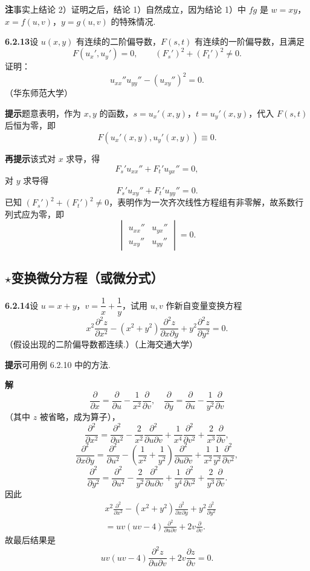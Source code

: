 \documentclass[UTF8, 12pt, fontset=fandol, oneside]{ctexart}
\begin{document}
\noindent\textbf{注}\quad 事实上结论 2）证明之后，结论 1）自然成立，因为结论 1）中 $fg$ 是 $w=xy$，$x=f(u,v)$，$y=g(u,v)$ 的特殊情况.

\noindent\textbf{6.2.13}\quad 设 $u(x,y)$ 有连续的二阶偏导数，$F(s,t)$ 有连续的一阶偏导数，且满足
\[
  F(u_x',u_y')=0,\qquad (F_s')^2+(F_t')^2\ne0.
\]
证明：
\[
  u_{xx}''u_{yy}''-(u_{xy}'')^2=0.
\]
（华东师范大学）

\noindent\textbf{提示}\quad 题意表明，作为 $x,y$ 的函数，$s=u_x'(x,y)$，$t=u_y'(x,y)$，代入 $F(s,t)$ 后恒为零，即
\[
  F(u_x'(x,y),u_y'(x,y))\equiv0.
\]

\noindent\textbf{再提示}\quad 该式对 $x$ 求导，得
\[
  F_s'u_{xx}''+F_t'u_{yx}''=0,
\]
对 $y$ 求导得
\[
  F_s'u_{xy}''+F_t'u_{yy}''=0.
\]
已知 $(F_s')^2+(F_t')^2\ne0$，表明作为一次齐次线性方程组有非零解，故系数行列式应为零，即
\[
  \begin{vmatrix}
  u_{xx}''&u_{yx}''\\
  u_{xy}''&u_{yy}''
  \end{vmatrix}=0.
\]

\subsection*{\ensuremath{\star}变换微分方程（或微分式）}

\noindent\textbf{6.2.14}\quad 设 $u=x+y$，$v=\dfrac1x+\dfrac1y$，试用 $u,v$ 作新自变量变换方程
\[
  x^2\frac{\partial^2z}{\partial x^2}
  -(x^2+y^2)\frac{\partial^2z}{\partial x\partial y}
  +y^2\frac{\partial^2z}{\partial y^2}=0.
\]
（假设出现的二阶偏导数都连续.）（上海交通大学）

\noindent\textbf{提示}\quad 可用例 6.2.10 中的方法.

\noindent\textbf{解}\quad
\[
  \frac{\partial}{\partial x}=\frac{\partial}{\partial u}-\frac1{x^2}\frac{\partial}{\partial v},\quad
  \frac{\partial}{\partial y}=\frac{\partial}{\partial u}-\frac1{y^2}\frac{\partial}{\partial v}
\]
（其中 $z$ 被省略，成为算子），
\[
  \frac{\partial^2}{\partial x^2}
  =\frac{\partial^2}{\partial u^2}-\frac2{x^2}\frac{\partial^2}{\partial u\partial v}
  +\frac1{x^4}\frac{\partial^2}{\partial v^2}+\frac2{x^3}\frac{\partial}{\partial v},
\]
\[
  \frac{\partial^2}{\partial x\partial y}
  =\frac{\partial^2}{\partial u^2}
  -\left(\frac1{x^2}+\frac1{y^2}\right)\frac{\partial^2}{\partial u\partial v}
  +\frac1{x^2}\frac1{y^2}\frac{\partial^2}{\partial v^2},
\]
\[
  \frac{\partial^2}{\partial y^2}
  =\frac{\partial^2}{\partial u^2}-\frac2{y^2}\frac{\partial^2}{\partial u\partial v}
  +\frac1{y^4}\frac{\partial^2}{\partial v^2}+\frac2{y^3}\frac{\partial}{\partial v}.
\]
因此
\[
\begin{aligned}
&x^2\frac{\partial^2}{\partial x^2}
-(x^2+y^2)\frac{\partial^2}{\partial x\partial y}
+y^2\frac{\partial^2}{\partial y^2}\\
&=uv(uv-4)\frac{\partial^2}{\partial u\partial v}+2v\frac{\partial}{\partial v}.
\end{aligned}
\]
故最后结果是
\[
  uv(uv-4)\frac{\partial^2z}{\partial u\partial v}
  +2v\frac{\partial z}{\partial v}=0.
\]
\end{document}
